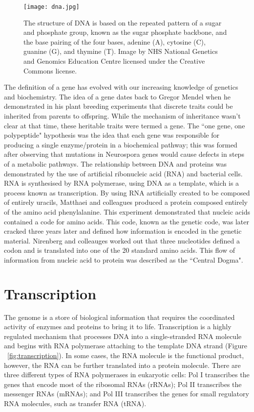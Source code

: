 \begin{figure}[h]
   \centering
   \texttt{[image: dna.jpg]}
   \caption[The structure of DNA]{The structure of DNA is based on the repeated pattern of a sugar and phosphate group, known as the sugar phosphate backbone, and the base pairing of the four bases, adenine (A), cytosine (C), guanine (G), and thymine (T). Image by NHS National Genetics and Genomics Education Centre licensed under the Creative Commons license.}
   \label{fig:dna}
\end{figure}

The definition of a gene has evolved with our increasing knowledge of genetics and biochemistry\cite{pmid17567988}. The idea of a gene dates back to Gregor Mendel when he demonstrated in his plant breeding experiments that discrete traits could be inherited from parents to offspring. While the mechanism of inheritance wasn't clear at that time, these heritable traits were termed a gene. The ``one gene, one polypeptide" hypothesis was the idea that each gene was responsible for producing a single enzyme/protein in a biochemical pathway; this was formed after observing that mutations in Neurospora genes would cause defects in steps of a metabolic pathways\cite{pmid16578042}. The relationship between DNA and proteins was demonstrated by the use of artificial ribonucleic acid (RNA) and bacterial cells\cite{pmid14471390}. RNA is synthesised by RNA polymerase, using DNA as a template, which is a process known as transcription. By using RNA artificially created to be composed of entirely uracils, Matthaei and colleagues produced a protein composed entirely of the amino acid phenylalanine. This experiment demonstrated that nucleic acids contained a code for amino acids. This code, known as the genetic code, was later cracked three years later\cite{pmid5330357} and defined how information is encoded in the genetic material. Nirenberg and colleauges worked out that three nucleotides defined a codon and is translated into one of the 20 standard amino acids. This flow of information from nucleic acid to protein was described as the ``Central Dogma"\cite{crick1958protein}.

\section{Transcription}

The genome is a store of biological information that requires the coordinated activity of enzymes and proteins to bring it to life. Transcription is a highly regulated mechanism that processes DNA into a single-stranded RNA molecule and begins with RNA polymerase attaching to the template DNA strand (Figure ~\ref{fig:transcription}). In some cases, the RNA molecule is the functional product, however, the RNA can be further translated into a protein molecule. There are three different types of RNA polymerases in eukaryotic cells: Pol I transcribes the genes that encode most of the ribosomal RNAs (rRNAs); Pol II transcribes the messenger RNAs (mRNAs); and Pol III transcribes the genes for small regulatory RNA molecules, such as transfer RNA (tRNA).

